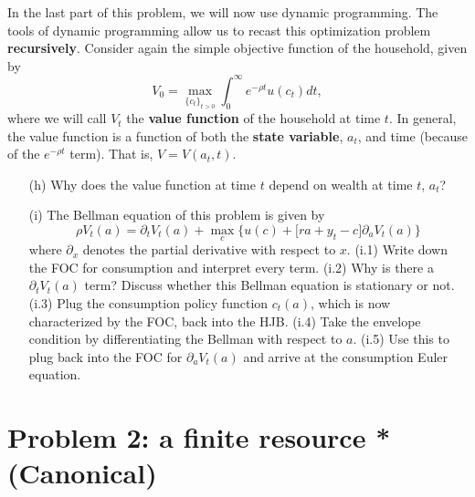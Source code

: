 \documentclass[11pt]{extarticle}
\theoremstyle{plain}
\theoremstyle{definition}
\begin{document}
\vspace{10mm}
\noindent
In the last part of this problem, we will now use dynamic programming. The tools of dynamic programming allow us to recast this optimization problem \textbf{recursively}. Consider again the simple objective function of the household, given by
\begin{equation*}
	V_0 = \max_{\{c_t\}_{t>0}} \int_0^\infty e^{-\rho t} u(c_t) dt,
\end{equation*}
where we will call $V_t$ the \textbf{value function} of the household at time $t$. In general, the value function is a function of both the \textbf{state variable}, $a_t$, and time (because of the $e^{-\rho t}$ term). That is, $V = V(a_t, t)$. 

\begin{enumerate}
	\item [(h)] Why does the value function at time $t$ depend on wealth at time $t$, $a_t$? 
\end{enumerate}


\begin{enumerate}
	\item [(i)] The Bellman equation of this problem is given by
	\begin{equation*}
		\rho V_t(a) = \partial_t V_t(a)+ \max_c \bigg\{ u(c) + \Big[ ra + y_t - c \Big] \partial_a V_t(a) \bigg\}
	\end{equation*}
	where $\partial_x$ denotes the partial derivative with respect to $x$. (i.1) Write down the FOC for consumption and interpret every term. (i.2) Why is there a $\partial_t V_t(a)$ term? Discuss whether this Bellman equation is stationary or not. (i.3) Plug the consumption policy function $c_t(a)$, which is now characterized by the FOC, back into the HJB. (i.4) Take the envelope condition by differentiating the Bellman with respect to $a$. (i.5) Use this to plug back into the FOC for $\partial_a V_t(a)$ and arrive at the consumption Euler equation.
\end{enumerate}





\vspace{10mm}
\section*{Problem 2: a finite resource  * (Canonical)}
\end{document}
